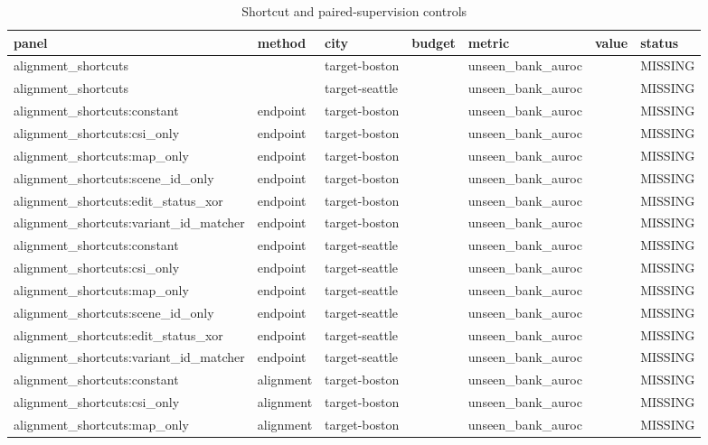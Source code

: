 \begin{longtable}{lllllll}
\caption{Shortcut and paired-supervision controls}\\
\toprule
panel & method & city & budget & metric & value & status \\
\midrule\endhead
alignment\_shortcuts &  & target-boston &  & unseen\_bank\_auroc &  & MISSING \\
alignment\_shortcuts &  & target-seattle &  & unseen\_bank\_auroc &  & MISSING \\
alignment\_shortcuts:constant & endpoint & target-boston &  & unseen\_bank\_auroc &  & MISSING \\
alignment\_shortcuts:csi\_only & endpoint & target-boston &  & unseen\_bank\_auroc &  & MISSING \\
alignment\_shortcuts:map\_only & endpoint & target-boston &  & unseen\_bank\_auroc &  & MISSING \\
alignment\_shortcuts:scene\_id\_only & endpoint & target-boston &  & unseen\_bank\_auroc &  & MISSING \\
alignment\_shortcuts:edit\_status\_xor & endpoint & target-boston &  & unseen\_bank\_auroc &  & MISSING \\
alignment\_shortcuts:variant\_id\_matcher & endpoint & target-boston &  & unseen\_bank\_auroc &  & MISSING \\
alignment\_shortcuts:constant & endpoint & target-seattle &  & unseen\_bank\_auroc &  & MISSING \\
alignment\_shortcuts:csi\_only & endpoint & target-seattle &  & unseen\_bank\_auroc &  & MISSING \\
alignment\_shortcuts:map\_only & endpoint & target-seattle &  & unseen\_bank\_auroc &  & MISSING \\
alignment\_shortcuts:scene\_id\_only & endpoint & target-seattle &  & unseen\_bank\_auroc &  & MISSING \\
alignment\_shortcuts:edit\_status\_xor & endpoint & target-seattle &  & unseen\_bank\_auroc &  & MISSING \\
alignment\_shortcuts:variant\_id\_matcher & endpoint & target-seattle &  & unseen\_bank\_auroc &  & MISSING \\
alignment\_shortcuts:constant & alignment & target-boston &  & unseen\_bank\_auroc &  & MISSING \\
alignment\_shortcuts:csi\_only & alignment & target-boston &  & unseen\_bank\_auroc &  & MISSING \\
alignment\_shortcuts:map\_only & alignment & target-boston &  & unseen\_bank\_auroc &  & MISSING \\

\end{longtable}
